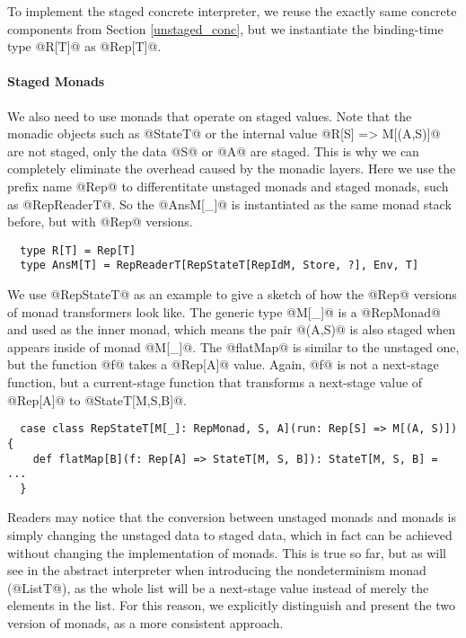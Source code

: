 To implement the staged concrete interpreter, we reuse the exactly same concrete
components from Section \ref{unstaged_conc}, but we instantiate the binding-time
type @R[T]@ as @Rep[T]@.

\paragraph{Staged Monads} We also need to use monads that operate on staged
values. Note that the monadic objects such as @StateT@ or the internal value
@R[S] => M[(A,S)]@ are not staged, only the data @S@ or @A@ are staged.
This is why we can completely eliminate the overhead caused by the monadic layers.
Here we use the prefix name @Rep@ to differentitate unstaged monads and staged
monads, such as @RepReaderT@. So the @AnsM[_]@ is instantiated as the same monad
stack before, but with @Rep@ versions.

\begin{lstlisting}
  type R[T] = Rep[T]
  type AnsM[T] = RepReaderT[RepStateT[RepIdM, Store, ?], Env, T]
\end{lstlisting}

We use @RepStateT@ as an example to give a sketch of how the @Rep@ versions of monad
transformers look like. The generic type @M[_]@ is a @RepMonad@ and used as the
inner monad, which means the pair @(A,S)@ is also staged when appears inside of monad
@M[_]@. The @flatMap@ is similar to the unstaged one, but the function @f@ takes
a @Rep[A]@ value. Again, @f@ is not a next-stage function, but a current-stage
function that transforms a next-stage value of @Rep[A]@ to @StateT[M,S,B]@.

\begin{lstlisting}
  case class RepStateT[M[_]: RepMonad, S, A](run: Rep[S] => M[(A, S)]) {
    def flatMap[B](f: Rep[A] => StateT[M, S, B]): StateT[M, S, B] = ...
  }
\end{lstlisting}

Readers may notice that the conversion between unstaged monads and monads is 
simply changing the unstaged data to staged data, which in fact can be achieved without
changing the implementation of monads. This is true so far, but as will see in
the abstract interpreter when introducing the nondeterminism monad (@ListT@), as
the whole list will be a next-stage value instead of merely the elements in the list.
For this reason, we explicitly distinguish and present the two version of
monads, as a more consistent approach.

